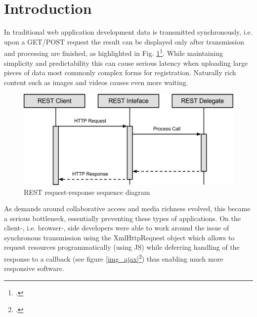 \listoffigures
{}
\newpage

\lstlistoflistings
{}
\newpage

\renewcommand{\thepage}{\arabic{page}}

\setcounter{page}{1} 

\renewcommand{\baselinestretch}{1.4}\normalsize

\section{Introduction}


In traditional web application development data is transmitted synchronously,
i.e. upon a GET/POST request the result can be displayed only after transmission
and processing are finished, as highlighted in Fig. \ref{img_req_res}\footcite{req_res}.
While maintaining simplicity and
predictability this can cause serious latency when uploading large pieces of
data most commonly complex forms for registration. Naturally rich content such
as images and videos causes even more waiting.

\begin{figure}[hbtp]
\centering
\includegraphics[scale=0.75]{img/rest_call.png}
\caption{REST request-response sequence diagram\label{img_req_res}}
\end{figure}

As demands around collaborative access and media richness evolved, this became a
serious bottleneck, essentially preventing these types of applications. On the
client-, i.e. browser-, side developers were able to work around the issue of
synchronous transmission using the XmlHttpRequest object which allows to request
resources programmatically (using JS) while
deferring handling of the response to a callback (see figure
\ref{img_ajax}\footcite{img_ajax}) thus enabling much more responsive software.

